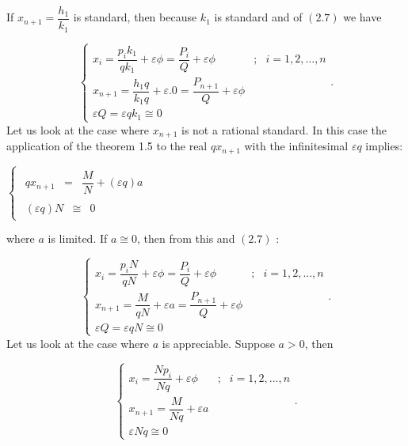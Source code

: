 \documentclass[12pt]{article}
\begin{document}
\noindent If $x_{n+1}=\dfrac{h_{1}}{k_{1}}$ is standard, then because $k_{1}$
is standard and of $(2.7)$ we have

\begin{equation}
\left\{ 
\begin{array}{ccc}
x_{i}=\dfrac{p_{i}k_{1}}{qk_{1}}+\varepsilon \phi =\dfrac{P_{i}}{Q}%
+\varepsilon \phi & ; & i=1,2,...,n \\ 
x_{n+1}=\dfrac{h_{1}q}{k_{1}q}+\varepsilon .0=\dfrac{P_{n+1}}{Q}+\varepsilon
\phi &  &  \\ 
\varepsilon Q=\varepsilon qk_{1}\cong 0 &  & 
\end{array}%
\text{.}\right.  \tag{2.8}
\end{equation}%
Let us look at the case where $x_{n+1}$ is not a rational standard. In this
case the application of the theorem 1.5 to the real $qx_{n+1}$ with the
infinitesimal $\varepsilon q$ implies:

\begin{center}
$\left\{ 
\begin{array}{c}
\begin{array}{ccc}
qx_{n+1} & = & \dfrac{M}{N}+\left( \varepsilon q\right) a%
\end{array}
\\ 
\begin{array}{ccc}
\left( \varepsilon q\right) N & \cong & 0%
\end{array}%
\end{array}%
\right. $
\end{center}

\noindent where $a$ is limited. If $a\cong 0$, then from this and $\left(
2.7\right) $ :

\begin{equation}
\left\{ 
\begin{array}{ccc}
x_{i}=\dfrac{p_{i}N}{qN}+\varepsilon \phi =\dfrac{P_{i}}{Q}+\varepsilon \phi
& ; & i=1,2,...,n \\ 
x_{n+1}=\dfrac{M}{qN}+\varepsilon a=\dfrac{P_{n+1}}{Q}+\varepsilon \phi &  & 
\\ 
\varepsilon Q=\varepsilon qN\cong 0 &  & 
\end{array}%
\text{.}\right.  \tag{2.9}
\end{equation}%
Let us look at the case where $a$ is appreciable. Suppose $a>0$, then

\begin{equation}
\left\{ 
\begin{array}{ccc}
x_{i}=\dfrac{Np_{i}}{Nq}+\varepsilon \phi & ; & i=1,2,...,n \\ 
x_{n+1}=\dfrac{M}{Nq}+\varepsilon a &  &  \\ 
\varepsilon Nq\cong 0 &  & 
\end{array}%
\text{.}\right.  \tag{2.10}
\end{equation}
\end{document}
